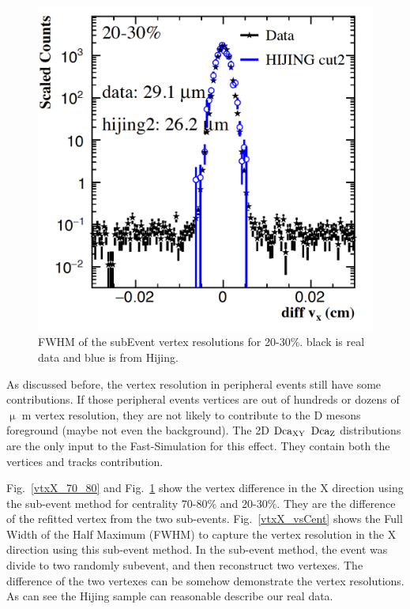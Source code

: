 \begin{figure}[htbp]
\begin{minipage}[htbp]{0.47\linewidth}
\includegraphics[width=1.0\textwidth,angle=0]{figure/Run14_D0HFT/vtxX_20_30.png} 
\caption{ FWHM of the subEvent vertex resolutions for 20-30\%. black is real data and blue is from Hijing.\label{vtxX_20_30}}
\end{minipage}
\end{figure}

As discussed before, the vertex resolution in peripheral events still have some contributions. If those peripheral events vertices are out of hundreds or dozens of $\upmu$ m vertex resolution, they are not likely to contribute to the D mesons foreground (maybe not even the background). The 2D $\textup{Dca}_{\textup{XY}}$ $\textup{Dca}_\textup{Z}$ distributions are the only input to the Fast-Simulation for this effect. They contain both the vertices and tracks contribution. 

Fig.~\ref{vtxX_70_80} and Fig.~\ref{vtxX_20_30} show the vertex difference in the X direction using the sub-event method for centrality 70-80\% and 20-30\%. They are the difference of the refitted vertex from the two sub-events. Fig.~\ref{vtxX_vsCent} shows the Full Width of the Half Maximum (FWHM) to capture the vertex resolution in the X direction using this sub-event method. In the sub-event method, the event was divide to two randomly subevent, and then reconstruct two vertexes. The difference of the two vertexes can be somehow demonstrate the vertex resolutions. As can see the Hijing sample can reasonable describe our real data.


